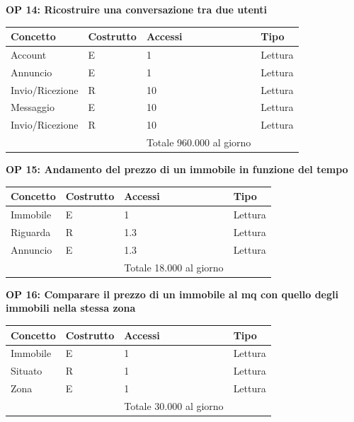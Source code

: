 \documentclass[a4paper,12pt]{report}
\begin{document}
            \textbf{OP 14: Ricostruire una conversazione tra due utenti}
        	\begin{table}[h!]
            \centering
             \begin{tabular}{||l l l l||}
             \hline
             Concetto & Costrutto & Accessi & Tipo \\ [0.5ex] 
             \hline\hline
             Account & E & 1 & Lettura \\ 
             Annuncio & E & 1 & Lettura \\ 
             Invio/Ricezione & R & 10 & Lettura \\ 
             Messaggio & E & 10 & Lettura \\ 
             Invio/Ricezione & R & 10 & Lettura \\ 
             \hline
                &   & Totale  960.000 al giorno &  \\ [1ex] 
             \hline
             \end{tabular}
            \end{table}

             \textbf{OP 15: Andamento del prezzo di un immobile in funzione del tempo}
        	\begin{table}[h!]
            \centering
             \begin{tabular}{||l l l l||}
             \hline
             Concetto & Costrutto & Accessi & Tipo \\ [0.5ex] 
             \hline\hline
             Immobile & E & 1 & Lettura \\ 
             Riguarda & R & 1.3 & Lettura \\ 
             Annuncio & E & 1.3 & Lettura \\ 
             \hline
                &   & Totale  18.000 al giorno &  \\ [1ex] 
             \hline
             \end{tabular}
            \end{table}

            \textbf{OP 16: Comparare il prezzo di un immobile al mq con quello degli immobili nella stessa zona}
        	\begin{table}[h!]
            \centering
             \begin{tabular}{||l l l l||}
             \hline
             Concetto & Costrutto & Accessi & Tipo \\ [0.5ex] 
             \hline\hline
             Immobile & E & 1 & Lettura \\ 
             Situato & R & 1 & Lettura \\ 
             Zona & E & 1 & Lettura \\ 
             \hline
                &   & Totale  30.000 al giorno &  \\ [1ex] 
             \hline
             \end{tabular}
            \end{table}
\end{document}
